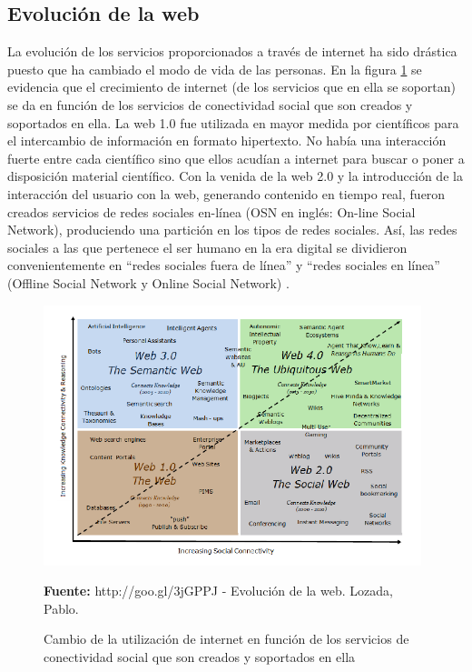\subsection{Evolución de la web}

La evolución de los servicios proporcionados a través de internet ha sido drástica puesto que ha cambiado el modo de vida de las personas. En la figura \ref{fig:utilizacion_internet} se evidencia que el crecimiento de internet (de los servicios que en ella se soportan) se da en función de los servicios de conectividad social que son creados y soportados en ella. La web 1.0 fue utilizada en mayor medida por científicos para el intercambio de información en formato hipertexto. No había una interacción fuerte entre cada científico sino que ellos acudían a internet para buscar o poner a disposición material científico. Con la venida de la web 2.0 y la introducción de la interacción del usuario con la web, generando contenido en tiempo real, fueron creados servicios de redes sociales en-línea (OSN en inglés: On-line Social Network), produciendo una partición en los tipos de redes sociales. Así, las redes sociales a las que pertenece el ser humano en la era digital se dividieron convenientemente en “redes sociales fuera de línea” y “redes sociales en línea” (Offline Social Network y Online Social Network) \cite{dynamics}.

\begin{figure}[!htb]
  \begin{center}
    \includegraphics[width=11cm]{./imagenes/utilizacion_internet.png}
    \caption{Cambio de la utilización de internet en función de los servicios de conectividad social que son creados y soportados en ella}
    \label{fig:utilizacion_internet}
    \textbf{Fuente:}  http://goo.gl/3jGPPJ - Evolución de la web. Lozada, Pablo.
  \end{center}
\end{figure}
